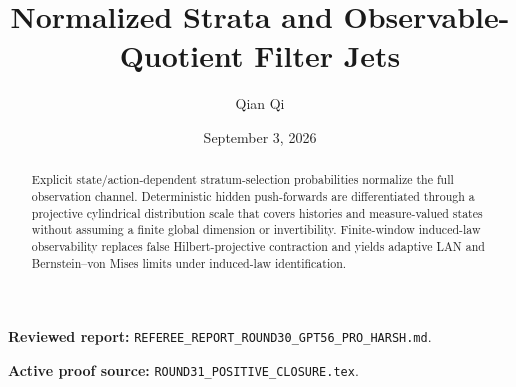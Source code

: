 \documentclass[11pt,reqno]{amsart}
\title[C1 Round 31 revision]{Normalized Strata and Observable-Quotient Filter Jets}
\author{Qian Qi}
\date{September 3, 2026}
\begin{document}
\begin{abstract}
Explicit state/action-dependent stratum-selection probabilities normalize the full observation channel.  Deterministic hidden push-forwards are differentiated through a projective cylindrical distribution scale that covers histories and measure-valued states without assuming a finite global dimension or invertibility.  Finite-window induced-law observability replaces false Hilbert-projective contraction and yields adaptive LAN and Bernstein--von Mises limits under induced-law identification.
\end{abstract}
\maketitle
\noindent\textbf{Reviewed report:} \texttt{REFEREE\_REPORT\_ROUND30\_GPT56\_PRO\_HARSH.md}.\par
\noindent\textbf{Active proof source:} \texttt{ROUND31\_POSITIVE\_CLOSURE.tex}.\par

\end{document}
